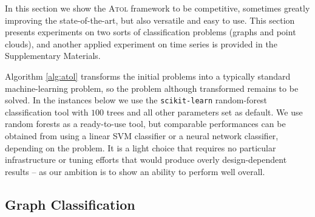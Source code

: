 \documentclass[twoside]{article}
\begin{document}
In this section we show the \textsc{Atol} framework to be competitive, sometimes greatly improving the state-of-the-art, but also versatile and easy to use. This section presents experiments on two sorts of classification problems (graphs and point clouds), and another applied experiment on time series is provided in the Supplementary Materials.

Algorithm \ref{alg:atol} transforms the initial problems into a typically standard machine-learning problem, so the problem although transformed remains to be solved. In the instances below we use the \texttt{scikit-learn} \cite{sklearn} random-forest classification tool with $100$ trees and all other parameters set as default. We use random forests as a ready-to-use tool, but comparable performances can be obtained from using a linear SVM classifier or a neural network classifier, depending on the problem. It is a light choice that requires no particular infrastructure or tuning efforts that would produce overly design-dependent results \--- as our ambition is to show an ability to perform well overall. 


\subsection{Graph Classification}
\label{sec:graphs}


\begin{table*}
	\caption{Mean accuracy and standard deviations for Large Social Network datasets.}
	\label{tab:res_social}
\end{table*}
\end{document}
